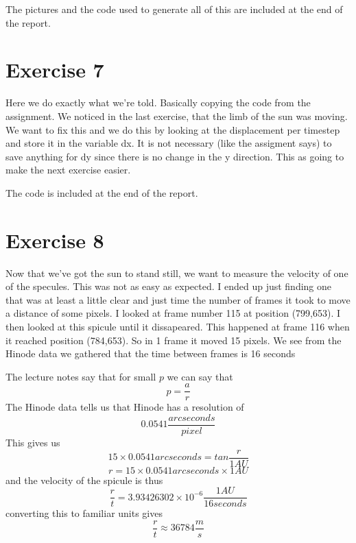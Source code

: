 \documentclass[a4paper,10pt]{report}
\begin{document}
The pictures and the code used to generate all of this are included at the end of the report.




\section{Exercise 7}

Here we do exactly what we're told. Basically copying the code from the assignment. 
We noticed in the last exercise, that the limb of the sun was moving. 
We want to fix this and we do this by looking at the displacement per timestep and store it in the variable dx. 
It is not necessary (like the assigment says) to save anything for dy since there is no change in the y direction.
This as going to make the next exercise easier. 

The code is included at the end of the report.


\section{Exercise 8}

Now that we've got the sun to stand still, we want to measure the velocity of one of the specules.
This was not as easy as expected. I ended up just finding one that was at least a little clear and 
just time the number of frames it took to move a distance of some pixels.
I looked at frame number 115 at position (799,653). I then looked at this spicule until it dissapeared.
This happened at frame 116 when it reached position (784,653). So in 1 frame it moved 15 pixels.
We see from the Hinode data we gathered that the time between frames is 16 seconds

The lecture notes say that for small $p$ we can say that 
\begin{equation}
 p = \frac{a}{r}
\end{equation}
The Hinode data tells us that Hinode has a resolution of 
\begin{equation}
0.0541\frac{arcseconds}{pixel}
\end{equation}
This gives us
$$15\times0.0541arcseconds = tan\frac{r}{1AU}$$
$$r = 15\times0.0541 arcseconds\times 1AU$$
and the velocity of the spicule is thus 
$$\frac{r}{t} = 3.93426302\times10^{-6}\frac{1AU}{16seconds}$$
converting this to familiar units gives
$$\frac{r}{t} \approx 36 784\frac{m}{s}$$
\end{document}
